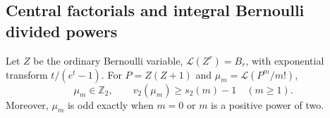 \subsection{Central factorials and integral Bernoulli divided powers}

\begin{lemma}
\label{lem:bernoulli-central-pd}
Let $Z$ be the ordinary Bernoulli variable,
$\mathcal L(Z^r)=B_r$, with exponential transform $t/(e^t-1)$.
For $P=Z(Z+1)$ and $\mu_m=\mathcal L(P^m/m!)$,
\begin{equation}
 \mu_m\in\mathbb Z_2,\qquad
 v_2(\mu_m)\geq s_2(m)-1\quad(m\geq1).
 \label{eq:bernoulli-central-moment-bound}
\end{equation}
Moreover, $\mu_m$ is odd exactly when $m=0$ or $m$ is a positive power
of two.
\end{lemma}

